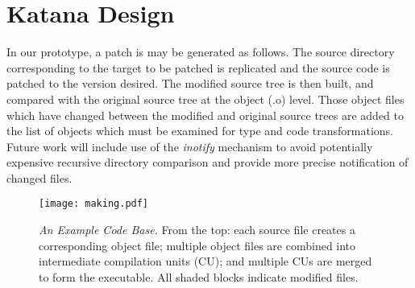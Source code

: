 \section{Katana Design}
\label{sec:design}

In our prototype, a patch is may be generated as follows. The source
directory corresponding to the target to be patched is replicated and
the source code is patched to the version desired. The modified source
tree is then built, and compared with the original source tree at the
object (.o) level. Those object files which have changed between the
modified and original source trees are added to the list of objects
which must be examined for type and code transformations. Future work
will include use of the {\it inotify} mechanism to avoid potentially
expensive recursive directory comparison and provide more precise
notification of changed files.


\begin{figure}[ht]
\begin{center}
\texttt{[image: making.pdf]}
\end{center}
\caption{{\small {\it An Example Code Base.} From the top: each source
    file creates a corresponding object file; multiple object files
    are combined into intermediate compilation units (CU); and
    multiple CUs are merged to form the executable. All shaded blocks
    indicate modified files.}}
\label{fig:making}
\end{figure}

